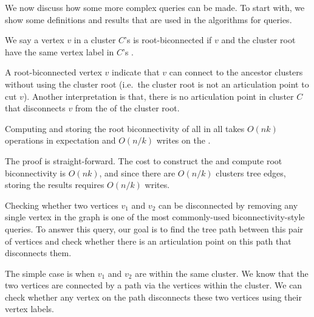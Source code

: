 \bigskip

We now discuss how some more complex queries can be made.  To start with, we show some definitions and results that are used in the algorithms for queries.

\begin{definition}
We say a vertex $v$ in a cluster $C$'s \localgraph{} is root-biconnected if $v$ and the cluster root have the same vertex label in $C$'s \localgraph{}.
\end{definition}

A root-biconnected vertex $v$ indicate that $v$ can connect to the ancestor clusters without using the cluster root (i.e.\ the cluster root is not an articulation point to cut $v$).  Another interpretation is that, there is no articulation point in cluster $C$ that disconnects $v$ from the \outver{} of the cluster root.

\begin{lemma}
Computing and storing the root biconnectivity of all \outvers{} in all
 takes $O(nk)$ operations in expectation and $O(n/k)$ writes
on the \seqmodel.
\end{lemma}
The proof is straight-forward.  The cost to construct the  and compute root biconnectivity is $O(nk)$, and since there are $O(n/k)$ clusters tree edges, storing the results requires $O(n/k)$ writes.

Checking whether two vertices $v_1$ and $v_2$ can be disconnected by removing any single vertex in the graph is one of the most commonly-used biconnectivity-style queries.
To answer this query, our goal is to find the tree path between this pair of vertices and check whether there is an articulation point on this path that disconnects them.

The simple case is when $v_1$ and $v_2$ are within the same cluster.
We know that the two vertices are connected by a path via the vertices within the cluster. We can check whether any vertex on the path disconnects these two vertices using their vertex labels.

